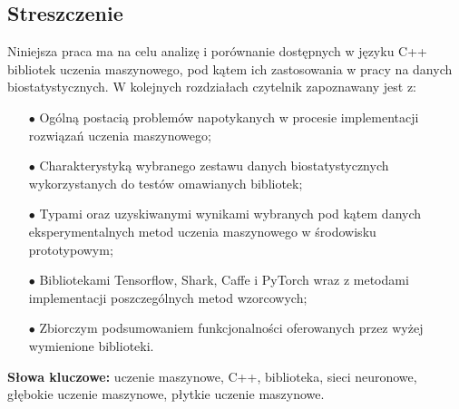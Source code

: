 
\subsection*{Streszczenie}

    Niniejsza praca ma na celu analizę i porównanie dostępnych w języku C++ bibliotek uczenia maszynowego, pod kątem ich zastosowania w pracy na danych biostatystycznych. W kolejnych rozdziałach czytelnik zapoznawany jest z:
    
    \begin{itemize}
    	\item [$\bullet$] Ogólną postacią problemów napotykanych w procesie implementacji rozwiązań uczenia maszynowego;
    	\item [$\bullet$] Charakterystyką wybranego zestawu danych biostatystycznych wykorzystanych do testów omawianych bibliotek;
    	\item [$\bullet$] Typami oraz uzyskiwanymi wynikami wybranych pod kątem danych eksperymentalnych metod uczenia maszynowego w środowisku prototypowym;
    	\item [$\bullet$] Bibliotekami Tensorflow, Shark, Caffe i PyTorch wraz z metodami implementacji poszczególnych metod wzorcowych;
    	\item [$\bullet$] Zbiorczym podsumowaniem funkcjonalności oferowanych przez wyżej wymienione biblioteki.
    \end{itemize}

	

\vspace{1cm}
\noindent\textbf{Słowa kluczowe:} uczenie maszynowe, C++, biblioteka, sieci neuronowe, głębokie uczenie maszynowe, płytkie uczenie maszynowe.
